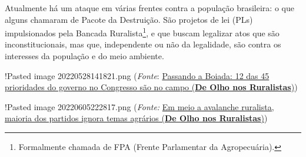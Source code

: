 Atualmente há um ataque em várias frentes contra a população brasileira:
o que alguns chamaram de Pacote da Destruição. São projetos de lei (PLs)
impulsionados pela Bancada Ruralista\footnote{Formalmente chamada de FPA
  (Frente Parlamentar da Agropecuária).}, e que buscam legalizar atos
que são inconstitucionais, mas que, independente ou não da legalidade,
são contra os interesses da população e do meio ambiente.

!Pasted image 20220528141821.png (\textit{Fonte}:
\href{https://deolhonosruralistas.com.br/2022/02/10/passando-a-boiada-12-das-45-prioridades-do-governo-no-congresso-sao-no-campo/?utm_source=rss\&utm_medium=rss\&utm_campaign=passando-a-boiada-12-das-45-prioridades-do-governo-no-congresso-sao-no-campo}{Passando
a Boiada: 12 das 45 prioridades do governo no Congresso são no campo
(\textbf{De Olho nos Ruralistas})})

!Pasted image 20220605222817.png (\textit{Fonte:}
\href{https://deolhonosruralistas.com.br/2022/02/07/em-meio-a-avalanche-ruralista-maioria-dos-partidos-ignora-temas-agrarios/?utm_source=pocket_mylist}{Em
meio a avalanche ruralista, maioria dos partidos ignora temas agrários
(\textbf{De Olho nos Ruralistas})})

